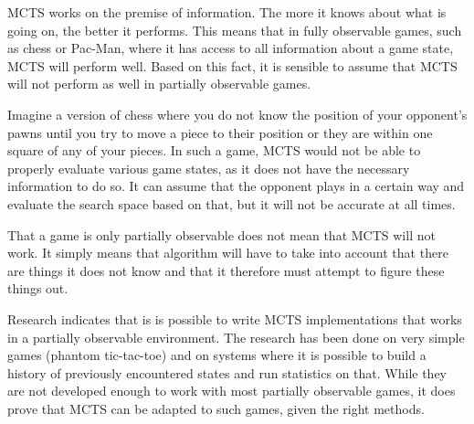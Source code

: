 MCTS works on the premise of information. The more it knows about what is going on, the better it performs. This means that in fully observable games, such as chess or Pac-Man, where it has access to all information about a game state, MCTS will perform well. Based on this fact, it is sensible to assume that MCTS will not perform as well in partially observable games. 

Imagine a version of chess where you do not know the position of your opponent's pawns until you try to move a piece to their position or they are within one square of any of your pieces. In such a game, MCTS would not be able to properly evaluate various game states, as it does not have the necessary information to do so. It can assume that the opponent plays in a certain way and evaluate the search space based on that, but it will not be accurate at all times.

That a game is only partially observable does not mean that MCTS will not work. It simply means that algorithm will have to take into account that there are things it does not know and that it therefore must attempt to figure these things out. 

Research indicates that is is possible to write MCTS implementations that works in a partially observable environment. The research has been done on very simple games (phantom tic-tac-toe)\cite{auger2011multiple} and on systems where it is possible to build a history of previously encountered states and run statistics on that\cite{silver2010monte}\cite{thrun1999monte}. While they are not developed enough to work with most partially observable games, it does prove that MCTS can be adapted to such games, given the right methods.




